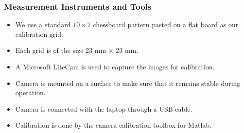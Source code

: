 \documentclass[10pt,a4paper]{article}
\begin{document}
			\subsubsection{Measurement Instruments and Tools}
				\begin{itemize}
					\item We use a standard $10 \times7$ chessboard pattern pasted on a flat board as our calibration grid.
					\item Each grid is of the size 23 mm $\times$ 23 mm.
					\item A Microsoft LiteCam is used to capture the images for calibration.
					\item Camera is mounted on a surface to make sure that it remains stable during operation. 
					\item Camera is connected with the laptop through a USB cable. 
						\item Calibration is done by the camera calibration toolbox for Matlab\cite{calTechCalib}. 
				\end{itemize}
\end{document}
